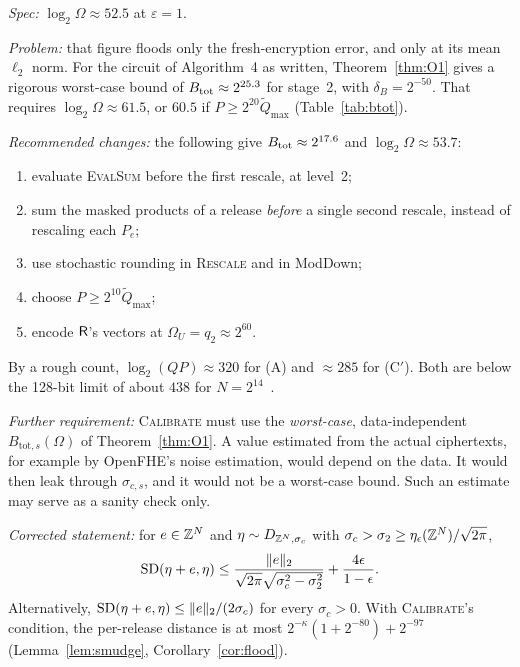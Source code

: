 \begin{correction}\label{cor:btot}
\emph{Spec:} $\log_2\Omega\approx52.5$ at $\varepsilon=1$.

\emph{Problem:} that figure floods only the fresh-encryption error, and only at its mean $\ell_2$ norm. For the circuit of Algorithm~4 as written, Theorem~\ref{thm:O1} gives a rigorous worst-case bound of $B_{\mathrm{tot}}\approx2^{25.3}$ for stage~2, with $\delta_B=2^{-50}$. That requires $\log_2\Omega\approx61.5$, or $60.5$ if $P\ge2^{20}\tilde Q_{\max}$ (Table~\ref{tab:btot}).

\emph{Recommended changes:} the following give $B_{\mathrm{tot}}\approx2^{17.6}$ and $\log_2\Omega\approx53.7$:
\begin{enumerate}[nosep,label=(\roman*)]
  \item evaluate \textsc{EvalSum} before the first rescale, at level~2;
  \item sum the masked products of a release \emph{before} a single second rescale, instead of rescaling each $P_e$;
  \item use stochastic rounding in \textsc{Rescale} and in ModDown;
  \item choose $P\ge2^{10}\tilde Q_{\max}$;
  \item encode $\mathsf{R}$'s vectors at $\Omega_U=q_2\approx2^{60}$.
\end{enumerate}
By a rough count, $\log_2(QP)\approx320$ for (A) and $\approx285$ for (C$'$). Both are below the 128-bit limit of about $438$ for $N=2^{14}$~\cite{HES}. 

\emph{Further requirement:} \textsc{Calibrate} must use the \emph{worst-case}, data-independent $B_{\mathrm{tot},s}(\Omega)$ of Theorem~\ref{thm:O1}. A value estimated from the actual ciphertexts, for example by OpenFHE's noise estimation, would depend on the data. It would then leak through $\sigma_{c,s}$, and it would not be a worst-case bound. Such an estimate may serve as a sanity check only.
\end{correction}

\begin{correction}\label{cor:smudge}
\emph{Corrected statement:} for $e\in\mathbb{Z}^N$ and $\eta\sim D_{\mathbb{Z}^N,\sigma_c}$ with $\sigma_c>\sigma_2\ge\eta_\epsilon(\mathbb{Z}^N)/\sqrt{2\pi}$,
\[
  \mathrm{SD}(\eta+e,\eta)\le\frac{\lVert e\rVert_2}{\sqrt{2\pi}\sqrt{\sigma_c^2-\sigma_2^2}}+\frac{4\epsilon}{1-\epsilon}.
\]
Alternatively, $\mathrm{SD}(\eta+e,\eta)\le\lVert e\rVert_2/(2\sigma_c)$ for every $\sigma_c>0$. With \textsc{Calibrate}'s condition, the per-release distance is at most $2^{-\kappa}(1+2^{-80})+2^{-97}$ (Lemma~\ref{lem:smudge}, Corollary~\ref{cor:flood}).
\end{correction}

